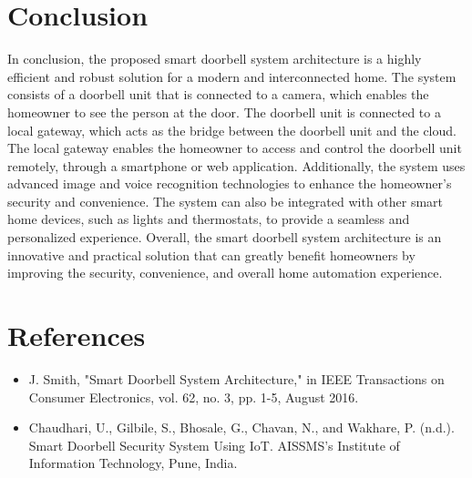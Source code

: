 \documentclass{report}
\begin{document}
\section{Conclusion}
In conclusion, the proposed smart doorbell system architecture is a highly efficient and robust solution for a modern and interconnected home. The system consists of a doorbell unit that is connected to a camera, which enables the homeowner to see the person at the door. The doorbell unit is connected to a local gateway, which acts as the bridge between the doorbell unit and the cloud. The local gateway enables the homeowner to access and control the doorbell unit remotely, through a smartphone or web application. Additionally, the system uses advanced image and voice recognition technologies to enhance the homeowner's security and convenience. The system can also be integrated with other smart home devices, such as lights and thermostats, to provide a seamless and personalized experience. Overall, the smart doorbell system architecture is an innovative and practical solution that can greatly benefit homeowners by improving the security, convenience, and overall home automation experience.

\section*{References}
\begin{itemize}
    \item J. Smith, "Smart Doorbell System Architecture," in IEEE Transactions on Consumer Electronics, vol. 62, no. 3, pp. 1-5, August 2016.\\
    \item Chaudhari, U., Gilbile, S., Bhosale, G., Chavan, N., and Wakhare, P. (n.d.). Smart Doorbell Security System Using IoT. AISSMS’s Institute of Information Technology, Pune, India.
\end{itemize}
\end{document}
